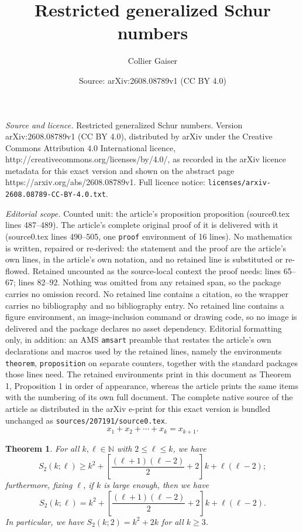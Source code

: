 \documentclass[10pt,a4paper]{amsart}
\title{Restricted generalized Schur numbers}
\author{Collier Gaiser}
\date{Source: arXiv:2608.08789v1 (CC BY 4.0)}
\newtheorem{theorem}{Theorem}
\begin{document}
\maketitle

\noindent\emph{Source and licence.} Restricted generalized Schur numbers. Version arXiv:2608.08789v1 (CC BY 4.0), distributed by arXiv under the Creative Commons Attribution 4.0 International licence, http://creativecommons.org/licenses/by/4.0/, as recorded in the arXiv licence metadata for this exact version and shown on the abstract page https://arxiv.org/abs/2608.08789v1. Full licence notice: \texttt{licenses/arxiv-2608.08789-CC-BY-4.0.txt}.\par\smallskip

\noindent\textit{Editorial scope.} Counted unit: the article's proposition proposition (source0.tex lines 487--489). The article's complete original proof of it is delivered with it (source0.tex lines 490--505, one \texttt{proof} environment of 16 lines). No mathematics is written, repaired or re-derived: the statement and the proof are the article's own lines, in the article's own notation, and no retained line is substituted or re-flowed.  Retained uncounted as the source-local context the proof needs: lines 65--67; lines 82--92.  Nothing was omitted from any retained span, so the package carries no omission record.  No retained line contains a citation, so the wrapper carries no bibliography and no bibliography entry.  No retained line contains a figure environment, an image-inclusion command or drawing code, so no image is delivered and the package declares no asset dependency.  Editorial formatting only, in addition: an AMS \texttt{amsart} preamble that restates the article's own declarations and macros used by the retained lines, namely the environments \texttt{theorem}, \texttt{proposition} on separate counters, together with the standard packages those lines need.  The retained environments print in this document as Theorem 1, Proposition 1 in order of appearance, whereas the article prints the same items with the numbering of its own full document.  The complete native source of the article as distributed in the arXiv e-print for this exact version is bundled unchanged as \texttt{sources/207191/source0.tex}.
\begin{equation}\label{Equaiton:Main}
x_1+x_2+\cdots+x_k=x_{k+1}.
\end{equation}

\begin{theorem}\label{Theorem:Main}
For all $k,\ell\in\mathbb{N}$ with $2\leq\ell\leq k$, we have
    \[
    S_2(k;\ell)\geq k^2+\left[\frac{(\ell+1)(\ell-2)}{2}+2\right]k+\ell(\ell-2);
    \]
furthermore, fixing $\ell$, if $k$ is large enough, then we have
 \[
    S_2(k;\ell)= k^2+\left[\frac{(\ell+1)(\ell-2)}{2}+2\right]k+\ell(\ell-2).
 \]
In particular, we have $S_2(k;2)=k^2+2k$ for all $k\geq3$.
\end{theorem}
\end{document}
